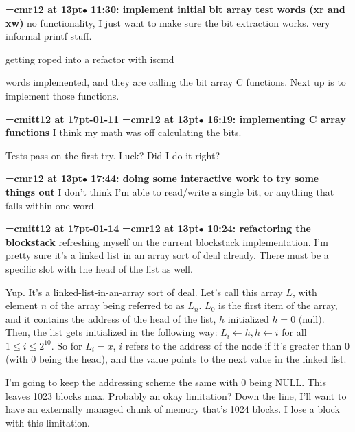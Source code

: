 {\smallskip\noindent\bf\font\titlefont=cmr12 at 13pt\titlefont $\bullet$ 11:30: implement initial bit array test words (xr and xw)}\smallskip
no functionality, I just want to make sure the bit extraction works. very informal printf stuff.
\par

getting roped into a refactor with iscmd
\par

words implemented, and they are calling the bit array C functions. Next up is to implement those functions.
\par

{\medskip\noindent\bf\font\titlefont=cmitt12 at 17pt-01-11}\medskip
{\smallskip\noindent\bf\font\titlefont=cmr12 at 13pt\titlefont $\bullet$ 16:19: implementing C array functions}\smallskip
I think my math was off calculating the bits.
\par

Tests pass on the first try. Luck? Did I do it right?
\par

{\smallskip\noindent\bf\font\titlefont=cmr12 at 13pt\titlefont $\bullet$ 17:44: doing some interactive work to try some things out}\smallskip
I don't think I'm able to read/write a single bit, or anything that falls within one word.
\par

{\medskip\noindent\bf\font\titlefont=cmitt12 at 17pt-01-14}\medskip
{\smallskip\noindent\bf\font\titlefont=cmr12 at 13pt\titlefont $\bullet$ 10:24: refactoring the blockstack}\smallskip
refreshing myself on the current blockstack implementation. I'm pretty sure it's a linked list in an array sort of deal already. There must be a specific slot with the head of the list as well.
\par

Yup. It's a linked-list-in-an-array sort of deal. Let's call this array $L$, with element $n$ of the array being referred to as $L_n$. $L_0$ is the first item of the array, and it contains the address of the head of the list, $h$ initialized $h = 0$ (null). Then, the list gets initialized in the following way: $L_i \leftarrow h, h \leftarrow i$ for all $1 \le i \le 2^{10}$. So for $L_i = x$, $i$ refers to the address of the node if it's greater than 0 (with 0 being the head), and the value points to the next value in the linked list.
\par

I'm going to keep the addressing scheme the same with 0 being NULL. This leaves 1023 blocks max. Probably an okay limitation? Down the line, I'll want to have an externally managed chunk of memory that's 1024 blocks. I lose a block with this limitation.
\par

